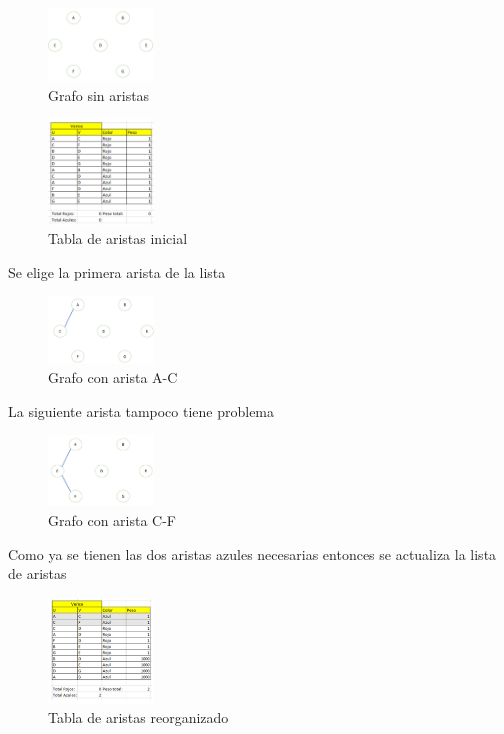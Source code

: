 \documentclass[conference,compsoc]{IEEEtran}
\begin{document}
\begin{figure}[h] 
    \centering
    \includegraphics[width=0.25\textwidth]{Problema2/s2.png}
    \caption{Grafo sin aristas}
    \label{fig:mesh1}
\end{figure}
\begin{figure}[h] 
    \centering
    \includegraphics[width=0.25\textwidth]{Problema2/s3.png}
    \caption{Tabla de aristas inicial}
    \label{fig:mesh1}
\end{figure}

$$$$$$$$$$$$
Se elige la primera arista de la lista
\begin{figure}[h] 
    \centering
    \includegraphics[width=0.25\textwidth]{Problema2/s4.png}
    \caption{Grafo con arista A-C}
    \label{fig:mesh1}
\end{figure}

$$$$
La siguiente arista tampoco tiene problema

\begin{figure}[h] 
    \centering
    \includegraphics[width=0.25\textwidth]{Problema2/s5.png}
    \caption{Grafo con arista C-F}
    \label{fig:mesh1}
\end{figure}

Como ya se tienen las dos aristas azules necesarias entonces se actualiza la lista de aristas

\begin{figure}[h] 
    \centering
    \includegraphics[width=0.25\textwidth]{Problema2/s6.png}
    \caption{Tabla de aristas reorganizado}
    \label{fig:mesh1}
\end{figure}
\end{document}
